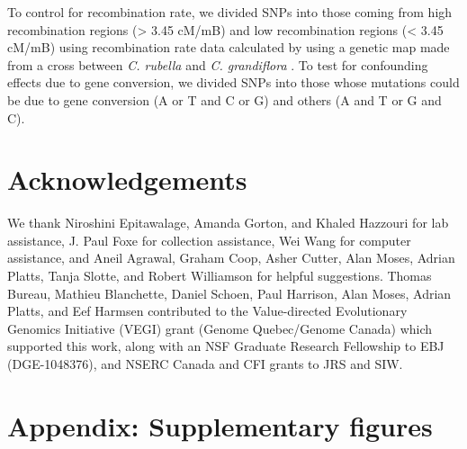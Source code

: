 To control for recombination rate, we divided SNPs into those coming from high recombination regions (> 3.45 cM/mB) and low recombination regions (< 3.45 cM/mB) using recombination rate data calculated by using a genetic map made from a cross between \textit{C. rubella} and \textit{C. grandiflora} \citep{Corbett-Detig2015-yo}. To test for confounding effects due to gene conversion, we divided SNPs into those whose mutations could be due to gene conversion (A or T and C or G) and others (A and T or G and C).

\section{Acknowledgements}
We thank Niroshini Epitawalage, Amanda Gorton, and Khaled Hazzouri for lab assistance, J. Paul Foxe for collection assistance, Wei Wang for computer assistance, and Aneil Agrawal, Graham Coop, Asher Cutter, Alan Moses, Adrian Platts, Tanja Slotte, and Robert Williamson for helpful suggestions. Thomas Bureau, Mathieu Blanchette, Daniel Schoen, Paul Harrison, Alan Moses, Adrian Platts, and Eef Harmsen contributed to the Value-directed Evolutionary Genomics Initiative (VEGI) grant (Genome Quebec/Genome Canada) which supported this work, along with an NSF Graduate Research Fellowship to EBJ (DGE-1048376), and NSERC Canada and CFI grants to JRS and SIW. 

\section{Appendix: Supplementary figures}


